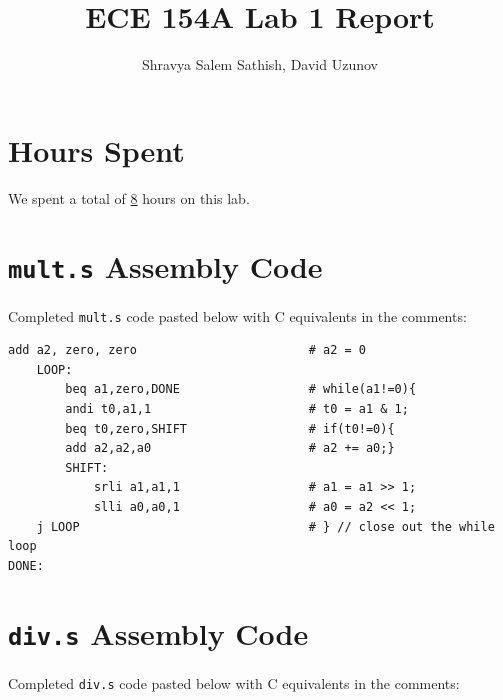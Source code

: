 \documentclass[11pt]{article}
\title{ECE 154A Lab 1 Report}
\author{Shravya Salem Sathish, David Uzunov}
\date{}
\begin{document}
\maketitle

\section{Hours Spent}

We spent a total of \underline{8} hours on this lab. 

\section{\texttt{mult.s} Assembly Code}

Completed \texttt{mult.s} code pasted below with C equivalents in the comments: 

\begin{Verbatim}
add a2, zero, zero                        # a2 = 0
    LOOP:                                  
        beq a1,zero,DONE                  # while(a1!=0){ 
        andi t0,a1,1                      # t0 = a1 & 1;
        beq t0,zero,SHIFT                 # if(t0!=0){
        add a2,a2,a0                      # a2 += a0;}
        SHIFT:
            srli a1,a1,1                  # a1 = a1 >> 1;
            slli a0,a0,1                  # a0 = a2 << 1;
    j LOOP                                # } // close out the while loop
DONE:
\end{Verbatim}

\section{\texttt{div.s} Assembly Code}

Completed \texttt{div.s} code pasted below with C equivalents in the comments:
\end{document}
